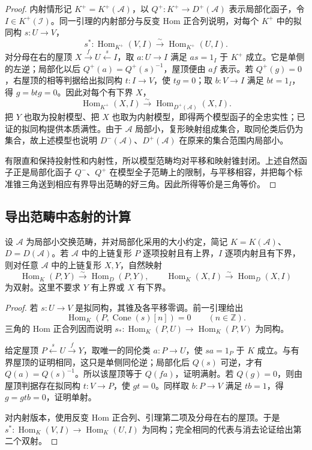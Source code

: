 \begin{proof}
	内射情形记 \(K^+=K^+(\mathcal A)\)，以 \(Q^+:K^+\to D^+(\mathcal A)\) 表示局部化函子，令 \(I\in K^+(\mathcal I)\)。同一引理的内射部分与反变 Hom 正合列说明，对每个 \(K^+\) 中的拟同构 \(s:U\to V\)，
	\[
		s^*:\operatorname{Hom}_{K^+}(V,I) \xrightarrow{\sim}\operatorname{Hom}_{K^+}(U,I).
	\]
	对分母在右的屋顶 \(X\xrightarrow{f}U\xleftarrow{s}I\)，取 \(a:U\to I\) 满足 \(as=1_I\) 于 \(K^+\) 成立。它是单侧的左逆；局部化以后 \(Q^+(a)=Q^+(s)^{-1}\)，屋顶便由 \(af\) 表示。若 \(Q^+(g)=0\)，右屋顶的相等判据给出拟同构 \(t:I\to V\)，使 \(tg=0\)；取 \(b:V\to I\) 满足 \(bt=1_I\)，得 \(g=btg=0\)。因此对每个有下界 \(X\)，
	\[
		\operatorname{Hom}_{K^+}(X,I) \xrightarrow{\sim}\operatorname{Hom}_{D^+(\mathcal A)}(X,I).
	\]
	把 \(Y\) 也取为投射模型、把 \(X\) 也取为内射模型，即得两个模型函子的全忠实性；已证的拟同构提供本质满性。由于 \(\mathcal A\) 局部小，复形映射组成集合，取同伦类后仍为集合，故上述模型也说明 \(D^-(\mathcal A)\)、\(D^+(\mathcal A)\) 在原来的集合范围内局部小。

	有限直和保持投射性和内射性，所以模型范畴均对平移和映射锥封闭。上述自然函子正是局部化函子 \(Q^-\)、\(Q^+\) 在模型全子范畴上的限制，与平移相容，并把每个标准锥三角送到相应有界导出范畴的好三角。因此所得等价是三角等价。
\end{proof}

\subsection{导出范畴中态射的计算}
\label{b4:subsec:1704:02}

\begin{proposition}\label{b4:prop:resolution-computes-derived-hom}
	设 \(\mathcal A\) 为局部小交换范畴，并对局部化采用的大小约定，简记 \(K=K(\mathcal A)\)、\(D=D(\mathcal A)\)。若 \(\mathcal A\) 中的上链复形 \(P\) 逐项投射且有上界，\(I\) 逐项内射且有下界，则对任意 \(\mathcal A\) 中的上链复形 \(X,Y\)，自然映射
	\[
		\operatorname{Hom}_{K}(P,Y)\xrightarrow{\sim}\operatorname{Hom}_{D}(P,Y), \qquad \operatorname{Hom}_{K}(X,I)\xrightarrow{\sim}\operatorname{Hom}_{D}(X,I)
	\]
	为双射。这里不要求 \(Y\) 有上界或 \(X\) 有下界。
\end{proposition}
\begin{proof}
	若 \(s:U\to V\) 是拟同构，其锥及各平移零调。前一引理给出
	\[
		\operatorname{Hom}_K(P,\operatorname{Cone}(s)[n])=0\qquad(n\in\mathbb Z).
	\]
	三角的 Hom 正合列因而说明 \(s_*:\operatorname{Hom}_K(P,U)\to\operatorname{Hom}_K(P,V)\) 为同构。

	给定屋顶 \(P\xleftarrow{s}U\xrightarrow{f}Y\)，取唯一的同伦类 \(a:P\to U\)，使 \(sa=1_P\) 于 \(K\) 成立。与有界屋顶的证明相同，这只是单侧同伦逆；局部化后 \(Q(s)\) 可逆，才有 \(Q(a)=Q(s)^{-1}\)。所以该屋顶等于 \(Q(fa)\)，证明满射。若 \(Q(g)=0\)，则由屋顶判据存在拟同构 \(t:V\to P\)，使 \(gt=0\)。同样取 \(b:P\to V\) 满足 \(tb=1\)，得 \(g=gtb=0\)，证明单射。

	对内射版本，使用反变 Hom 正合列、引理第二项及分母在右的屋顶。于是 \(s^*:\operatorname{Hom}_K(V,I)\to\operatorname{Hom}_K(U,I)\) 为同构；完全相同的代表与消去论证给出第二个双射。
\end{proof}

